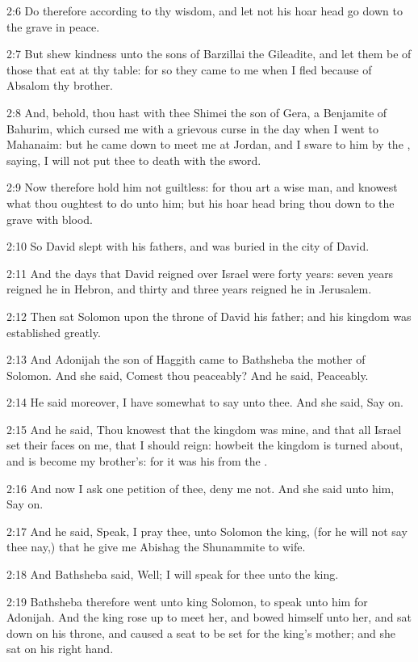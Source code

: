 2:6 Do therefore according to thy wisdom, and let not his hoar head go
down to the grave in peace.

2:7 But shew kindness unto the sons of Barzillai the Gileadite, and
let them be of those that eat at thy table: for so they came to me
when I fled because of Absalom thy brother.

2:8 And, behold, thou hast with thee Shimei the son of Gera, a
Benjamite of Bahurim, which cursed me with a grievous curse in the day
when I went to Mahanaim: but he came down to meet me at Jordan, and I
sware to him by the \LORD, saying, I will not put thee to death with
the sword.

2:9 Now therefore hold him not guiltless: for thou art a wise man, and
knowest what thou oughtest to do unto him; but his hoar head bring
thou down to the grave with blood.

2:10 So David slept with his fathers, and was buried in the city of
David.

2:11 And the days that David reigned over Israel were forty years:
seven years reigned he in Hebron, and thirty and three years reigned
he in Jerusalem.

2:12 Then sat Solomon upon the throne of David his father; and his
kingdom was established greatly.

2:13 And Adonijah the son of Haggith came to Bathsheba the mother of
Solomon. And she said, Comest thou peaceably? And he said, Peaceably.

2:14 He said moreover, I have somewhat to say unto thee. And she said,
Say on.

2:15 And he said, Thou knowest that the kingdom was mine, and that all
Israel set their faces on me, that I should reign: howbeit the kingdom
is turned about, and is become my brother's: for it was his from the
\LORD.

2:16 And now I ask one petition of thee, deny me not. And she said
unto him, Say on.

2:17 And he said, Speak, I pray thee, unto Solomon the king, (for he
will not say thee nay,) that he give me Abishag the Shunammite to
wife.

2:18 And Bathsheba said, Well; I will speak for thee unto the king.

2:19 Bathsheba therefore went unto king Solomon, to speak unto him for
Adonijah. And the king rose up to meet her, and bowed himself unto
her, and sat down on his throne, and caused a seat to be set for the
king's mother; and she sat on his right hand.

